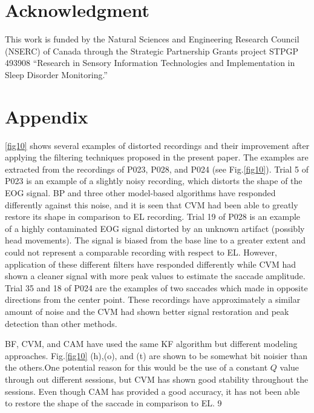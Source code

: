 \documentclass[transmag]{IEEEtran}
\begin{document}
\section*{Acknowledgment}

This work is funded by the Natural Sciences and Engineering Research Council (NSERC) of Canada through the Strategic Partnership Grants project STPGP 493908 “Research in Sensory Information Technologies and Implementation in Sleep Disorder Monitoring.”






\section{Appendix}
\label{appA}

\ref{fig10} shows several examples of distorted recordings and their improvement after applying the filtering techniques proposed in the present paper. The examples are extracted from the recordings of P023, P028, and P024 (see Fig.\ref{fig10}). Trial 5 of P023 is an example of a slightly noisy recording, which distorts the shape of the EOG signal. BP and three other model-based algorithms have responded differently against this noise, and it is seen that CVM had been able to greatly restore its shape in comparison to EL recording. Trial 19 of P028 is an example of a highly contaminated EOG signal distorted by an unknown artifact (possibly head movements). The signal is biased from the base line to a greater extent and could not represent a comparable recording with respect to EL. However, application of these different filters have responded differently while CVM had shown a cleaner signal with more peak values to estimate the saccade amplitude. Trial 35 and 18 of P024 are the examples of two saccades which made in opposite directions from the center point. These recordings have approximately a similar amount of noise and the CVM had shown better signal restoration and peak detection than other methods. 

BF, CVM, and CAM have used the same KF algorithm but different modeling approaches.  Fig.\ref{fig10} (h),(o), and (t) are shown to be somewhat bit noisier than the others.One potential reason for this would be the use of a constant $Q$ value through out different sessions, but CVM has shown good stability throughout the sessions. Even though CAM has provided a good accuracy, it has not been able to restore the shape of the saccade in comparison to EL.   
9
\end{document}
